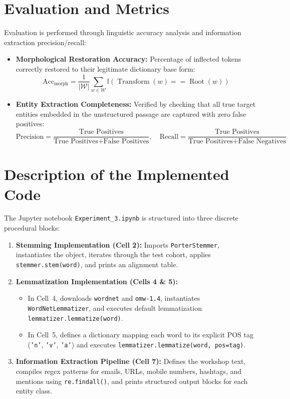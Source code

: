 \documentclass[12pt,a4paper]{report}
\begin{document}
\section{Evaluation and Metrics}
Evaluation is performed through linguistic accuracy analysis and information extraction precision/recall:
\begin{itemize}
    \item \textbf{Morphological Restoration Accuracy:} Percentage of inflected tokens correctly restored to their legitimate dictionary base form:
    \begin{equation}
        \text{Acc}_{\text{morph}} = \frac{1}{|\mathcal{W}|} \sum_{w \in \mathcal{W}} \mathbb{I}(\operatorname{Transform}(w) == \operatorname{Root}(w))
    \end{equation}
    \item \textbf{Entity Extraction Completeness:} Verified by checking that all true target entities embedded in the unstructured passage are captured with zero false positives:
    \begin{equation}
        \text{Precision} = \frac{\text{True Positives}}{\text{True Positives} + \text{False Positives}}, \quad \text{Recall} = \frac{\text{True Positives}}{\text{True Positives} + \text{False Negatives}}
    \end{equation}
\end{itemize}

\section{Description of the Implemented Code}
The Jupyter notebook \texttt{Experiment\_3.ipynb} is structured into three discrete procedural blocks:
\begin{enumerate}
    \item \textbf{Stemming Implementation (Cell 2):} Imports \texttt{PorterStemmer}, instantiates the object, iterates through the test cohort, applies \texttt{stemmer.stem(word)}, and prints an alignment table.
    \item \textbf{Lemmatization Implementation (Cells 4 \& 5):} 
    \begin{itemize}
        \item In Cell~4, downloads \texttt{wordnet} and \texttt{omw-1.4}, instantiates \texttt{WordNetLemmatizer}, and executes default lemmatization \texttt{lemmatizer.lemmatize(word)}.
        \item In Cell~5, defines a dictionary mapping each word to its explicit POS tag (\texttt{'n'}, \texttt{'v'}, \texttt{'a'}) and executes \texttt{lemmatizer.lemmatize(word, pos=tag)}.
    \end{itemize}
    \item \textbf{Information Extraction Pipeline (Cell 7):} Defines the workshop text, compiles regex patterns for emails, URLs, mobile numbers, hashtags, and mentions using \texttt{re.findall()}, and prints structured output blocks for each entity class.
\end{enumerate}
\end{document}
